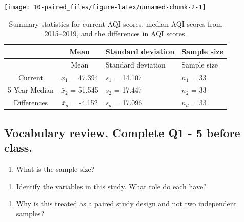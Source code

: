 \documentclass[
]{report}
\providecommand{\tightlist}{%
  \setlength{\itemsep}{0pt}\setlength{\parskip}{0pt}}
\begin{document}
\vspace{.05in}

\begin{center}\texttt{[image: 10-paired\_files/figure-latex/unnamed-chunk-2-1]} \end{center}

\vspace{.2in}

\begin{longtable}[]{@{}ccll@{}}
\caption{Summary statistics for current AQI scores, median AQI scores from 2015--2019, and the differences in AQI scores.}\tabularnewline
\toprule
& Mean & Standard deviation & Sample size\tabularnewline
\midrule
\endfirsthead
\toprule
& Mean & Standard deviation & Sample size\tabularnewline
\midrule
\endhead
Current & \(\bar{x}_1\) = 47.394 & \(s_1\) = 14.107 & \(n_1\) = 33\tabularnewline
5 Year Median & \(\bar{x}_2\) = 51.545 & \(s_2\) = 17.447 & \(n_2\) = 33\tabularnewline
Differences & \(\bar{x}_d\) = -4.152 & \(s_d\) = 17.096 & \(n_d\) = 33\tabularnewline
\bottomrule
\end{longtable}

\newpage

\hypertarget{vocabulary-review.-complete-q1---5-before-class.}{%
\subsection*{Vocabulary review. Complete Q1 - 5 before class.}\label{vocabulary-review.-complete-q1---5-before-class.}}

\begin{enumerate}
\def\labelenumi{\arabic{enumi}.}
\tightlist
\item
  What is the sample size?
\end{enumerate}

\vspace{0.5in}

\begin{enumerate}
\def\labelenumi{\arabic{enumi}.}
\setcounter{enumi}{1}
\tightlist
\item
  Identify the variables in this study. What role do each have?
\end{enumerate}

\vspace{.8in}

\begin{enumerate}
\def\labelenumi{\arabic{enumi}.}
\setcounter{enumi}{2}
\tightlist
\item
  Why is this treated as a paired study design and not two independent samples?
\end{enumerate}
\end{document}
